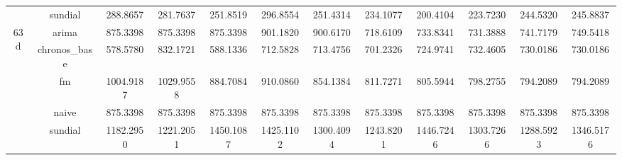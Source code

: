 \begin{table}[H]
{\begin{tabular}{cccccccccccc}
 & sundial & 288.8657 & 281.7637 & 251.8519 & 296.8554 & 251.4314 & 234.1077 & 200.4104 & 223.7230 & 244.5320 & 245.8837 \\
\multirow[c]{5}{*}{63d} & arima & 875.3398 & 875.3398 & 875.3398 & 901.1820 & 900.6170 & 718.6109 & 733.8341 & 731.3888 & 741.7179 & 749.5418 \\
 & chronos_base & 578.5780 & 832.1721 & 588.1336 & 712.5828 & 713.4756 & 701.2326 & 724.9741 & 732.4605 & 730.0186 & 730.0186 \\
 & fm & 1004.9187 & 1029.9558 & 884.7084 & 910.0860 & 854.1384 & 811.7271 & 805.5944 & 798.2755 & 794.2089 & 794.2089 \\
 & naive & 875.3398 & 875.3398 & 875.3398 & 875.3398 & 875.3398 & 875.3398 & 875.3398 & 875.3398 & 875.3398 & 875.3398 \\
 & sundial & 1182.2950 & 1221.2051 & 1450.1087 & 1425.1102 & 1300.4094 & 1243.8201 & 1446.7246 & 1303.7266 & 1288.5923 & 1346.5176 \\
\bottomrule
\end{tabular}

 }
\end{table}